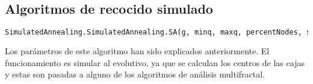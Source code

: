 \subsection{Algoritmos de recocido simulado}

\begin{lstlisting}[language=python]
SimulatedAnnealing.SimulatedAnnealing.SA(g, minq, maxq, percentNodes, sizePopulation, Kmax, typeAlgorithm)
\end{lstlisting}

Los parámetros de este algoritmo han sido explicados anteriormente. El funcionamiento es simular al evolutivo, ya que se calculan los centros de las cajas y estas son pasadas a alguno de los algoritmos de análisis multifractal.